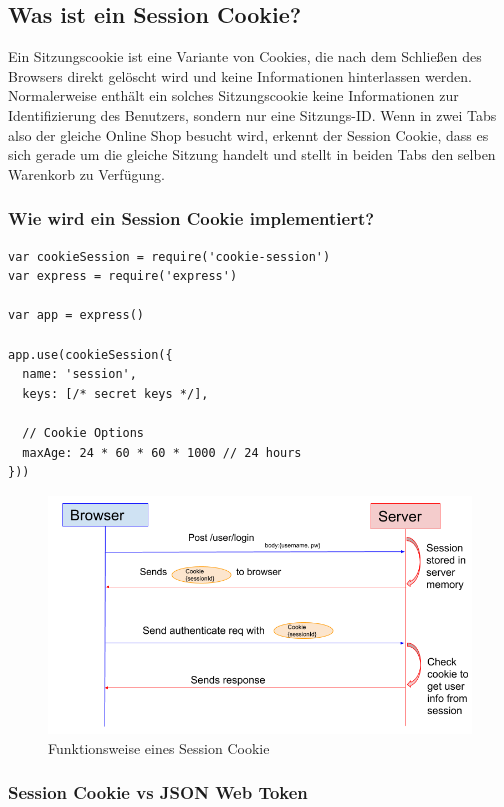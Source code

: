 \subsection{Was ist ein Session Cookie?}


Ein Sitzungscookie ist eine Variante von Cookies, die nach dem Schließen des Browsers direkt gelöscht wird und keine Informationen hinterlassen werden. Normalerweise enthält ein solches Sitzungscookie keine Informationen zur Identifizierung des Benutzers, sondern nur eine Sitzungs-ID.
Wenn in zwei Tabs also der gleiche Online Shop besucht wird, erkennt der Session Cookie, dass es sich gerade um die gleiche Sitzung handelt und stellt in beiden Tabs den selben Warenkorb zu Verfügung.

\subsubsection{Wie wird ein Session Cookie implementiert?}

\begin{lstlisting}
var cookieSession = require('cookie-session')
var express = require('express')

var app = express()

app.use(cookieSession({
  name: 'session',
  keys: [/* secret keys */],

  // Cookie Options
  maxAge: 24 * 60 * 60 * 1000 // 24 hours
}))
\end{lstlisting}


\begin{figure}[h!]
    \centering
    \includegraphics[width=0.7\linewidth]{pics/session-cookie-funktion.png}
    \caption{Funktionsweise eines Session Cookie}
    \label{fig:enter-label}
\end{figure}

\subsubsection{Session Cookie vs JSON Web Token}

